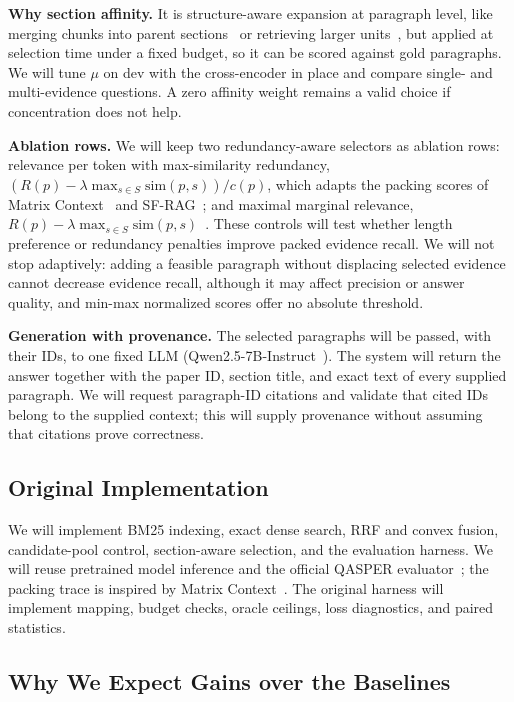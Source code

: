 \documentclass[sigconf, nonacm]{acmart}
\newcommand{\minihead}[1]{{\noindent\textbf{#1.} }}
\begin{document}
\minihead{Why section affinity} It is structure-aware expansion at paragraph level, like merging chunks into parent sections~\cite{llamaindexautomerge} or retrieving larger units~\cite{jiang2024longrag, sarthi2024raptor}, but applied at selection time under a fixed budget, so it can be scored against gold paragraphs. We will tune $\mu$ on dev with the cross-encoder in place and compare single- and multi-evidence questions. A zero affinity weight remains a valid choice if concentration does not help.

\minihead{Ablation rows} We will keep two redundancy-aware selectors as ablation rows: relevance per token with max-similarity redundancy, $(R(p)-\lambda\max_{s\in S}\mathrm{sim}(p,s))/c(p)$, which adapts the packing scores of Matrix Context~\cite{matrixcontext} and SF-RAG~\cite{yu2026sfrag}; and maximal marginal relevance, $R(p)-\lambda\max_{s\in S}\mathrm{sim}(p,s)$~\cite{carbonell1998mmr}. These controls will test whether length preference or redundancy penalties improve packed evidence recall. We will not stop adaptively: adding a feasible paragraph without displacing selected evidence cannot decrease evidence recall, although it may affect precision or answer quality, and min-max normalized scores offer no absolute threshold.

\minihead{Generation with provenance} The selected paragraphs will be passed, with their IDs, to one fixed LLM (Qwen2.5-7B-Instruct~\cite{qwen25}). The system will return the answer together with the paper ID, section title, and exact text of every supplied paragraph. We will request paragraph-ID citations and validate that cited IDs belong to the supplied context; this will supply provenance without assuming that citations prove correctness.

\subsection{Original Implementation}

We will implement BM25 indexing, exact dense search, RRF and convex fusion, candidate-pool control, section-aware selection, and the evaluation harness. We will reuse pretrained model inference and the official QASPER evaluator~\cite{dasigi2021qasper}; the packing trace is inspired by Matrix Context~\cite{matrixcontext}. The original harness will implement mapping, budget checks, oracle ceilings, loss diagnostics, and paired statistics.

\subsection{Why We Expect Gains over the Baselines}
\end{document}
